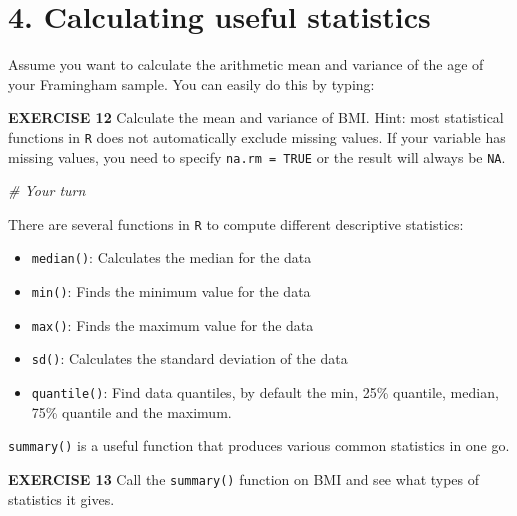 \documentclass[
]{article}
\newenvironment{Shaded}{\begin{snugshade}}{\end{snugshade}}
\newcommand{\CommentTok}[1]{\textcolor[rgb]{0.56,0.35,0.01}{\textit{#1}}}
\newcommand{\KeywordTok}[1]{\textcolor[rgb]{0.13,0.29,0.53}{\textbf{#1}}}
\newcommand{\NormalTok}[1]{#1}
\newcommand{\OperatorTok}[1]{\textcolor[rgb]{0.81,0.36,0.00}{\textbf{#1}}}
\providecommand{\tightlist}{%
  \setlength{\itemsep}{0pt}\setlength{\parskip}{0pt}}
\begin{document}
\hypertarget{calculating-useful-statistics}{%
\section{4. Calculating useful
statistics}\label{calculating-useful-statistics}}

Assume you want to calculate the arithmetic mean and variance of the age
of your Framingham sample. You can easily do this by typing:

\begin{Shaded}
\end{Shaded}

\textbf{EXERCISE 12} Calculate the mean and variance of BMI. Hint: most
statistical functions in \texttt{R} does not automatically exclude
missing values. If your variable has missing values, you need to specify
\texttt{na.rm\ =\ TRUE} or the result will always be \texttt{NA}.

\begin{Shaded}
\begin{Highlighting}[]
\CommentTok{# Your turn}
\end{Highlighting}
\end{Shaded}

There are several functions in \texttt{R} to compute different
descriptive statistics:

\begin{itemize}
\tightlist
\item
  \texttt{median()}: Calculates the median for the data
\item
  \texttt{min()}: Finds the minimum value for the data
\item
  \texttt{max()}: Finds the maximum value for the data
\item
  \texttt{sd()}: Calculates the standard deviation of the data
\item
  \texttt{quantile()}: Find data quantiles, by default the min, 25\%
  quantile, median, 75\% quantile and the maximum.
\end{itemize}

\texttt{summary()} is a useful function that produces various common
statistics in one go.

\textbf{EXERCISE 13} Call the \texttt{summary()} function on BMI and see
what types of statistics it gives.
\end{document}
